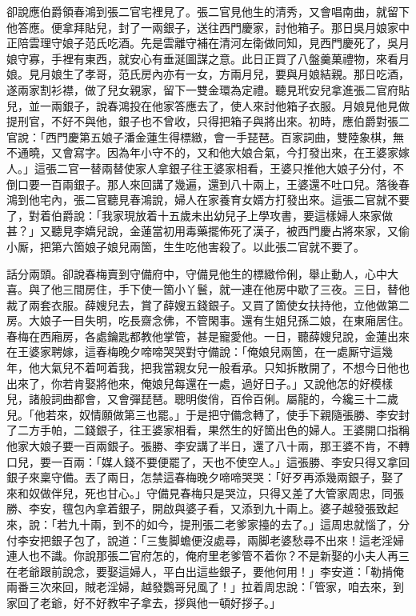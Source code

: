 卻說應伯爵領春鴻到張二官宅裡見了。張二官見他生的清秀，又會唱南曲，就留下他答應。便拿拜貼兒，封了一兩銀子，送往西門慶家，討他箱子。那日吳月娘家中正陪雲理守娘子范氏吃酒。先是雲離守補在清河左衛做同知，見西門慶死了，吳月娘守寡，手裡有東西，就安心有垂涎圖謀之意。{}此日正買了八盤羹菓禮物，來看月娘。見月娘生了孝哥，范氏房內亦有一女，方兩月兒，要與月娘結親。那日吃酒，遂兩家割衫襟，做了兒女親家，留下一雙金環為定禮。聽見玳安兒拿進張二官府貼兒，並一兩銀子，說春鴻投在他家答應去了，使人來討他箱子衣服。月娘見他見做提刑官，不好不與他，銀子也不曾收，只得把箱子與將出來。初時，應伯爵對張二官說：「西門慶第五娘子潘金蓮生得標緻，會一手琵琶。百家詞曲，雙陸象棋，無不通曉，又會寫字。因為年小守不的，又和他大娘合氣，今打發出來，在王婆家嫁人。」這張二官一替兩替使家人拿銀子往王婆家相看，王婆只推他大娘子分付，不倒口要一百兩銀子。那人來回講了幾遍，還到八十兩上，王婆還不吐口兒。落後春鴻到他宅內，張二官聽見春鴻說，婦人在家養育女婿方打發出來。這張二官就不要了，對着伯爵說：「我家現放着十五歲未出幼兒子上學攻書，要這樣婦人來家做甚？」又聽見李嬌兒說，{}金蓮當初用毒藥擺佈死了漢子，被西門慶占將來家，又偷小厮，把第六箇娘子娘兒兩箇，生生吃他害殺了。以此張二官就不要了。

話分兩頭。卻說春梅賣到守備府中，守備見他生的標緻伶俐，舉止動人，心中大喜。與了他三間房住，手下使一箇小丫鬟，就一連在他房中歇了三夜。三日，替他裁了兩套衣服。薛嫂兒去，賞了薛嫂五錢銀子。又買了箇使女扶持他，立他做第二房。大娘子一目失明，吃長齋念佛，不管閑事。還有生姐兒孫二娘，在東廂居住。春梅在西廂房，各處鑰匙都教他掌管，甚是寵愛他。一日，聽薛嫂兒說，金蓮出來在王婆家聘嫁，這春梅晚夕啼啼哭哭對守備說：「俺娘兒兩箇，在一處厮守這幾年，他大氣兒不着呵着我，把我當親女兒一般看承。只知拆散開了，不想今日他也出來了，你若肯娶將他來，俺娘兒每還在一處，過好日子。」又說他怎的好模樣兒，諸般詞曲都會，又會彈琵琶。聰明俊俏，百伶百俐。屬龍的，今纔三十二歲兒。「他若來，奴情願做第三也罷。」{}于是把守備念轉了，使手下親隨張勝、李安封了二方手帕，二錢銀子，往王婆家相看，果然生的好箇出色的婦人。王婆開口指稱他家大娘子要一百兩銀子。張勝、李安講了半日，還了八十兩，那王婆不肯，不轉口兒，要一百兩：「媒人錢不要便罷了，天也不使空人。」{}這張勝、李安只得又拿回銀子來稟守備。丟了兩日，怎禁這春梅晚夕啼啼哭哭：「好歹再添幾兩銀子，娶了來和奴做伴兒，死也甘心。」守備見春梅只是哭泣，只得又差了大管家周忠，同張勝、李安，氊包內拿着銀子，開啟與婆子看，又添到九十兩上。婆子越發張致起來，說：「若九十兩，到不的如今，提刑張二老爹家擡的去了。」這周忠就惱了，分付李安把銀子包了，說道：「三隻脚蟾便沒處尋，兩脚老婆愁尋不出來！這老淫婦連人也不識。你說那張二官府怎的，俺府里老爹管不着你？不是新娶的小夫人再三在老爺跟前說念，要娶這婦人，平白出這些銀子，要他何用！」李安道：「勒掯俺兩番三次來回，賊老淫婦，越發鸚哥兒風了！」拉着周忠說：「管家，咱去來，到家回了老爺，好不好教牢子拿去，拶與他一頓好拶子。」

